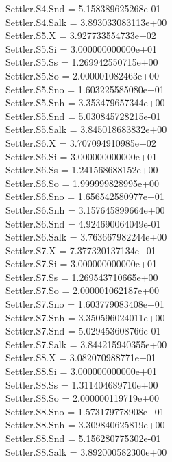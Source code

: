 Settler.S4.Snd = 5.158389625268e-01\\
Settler.S4.Salk = 3.893033083113e+00\\
Settler.S5.X = 3.927733554733e+02\\
Settler.S5.Si = 3.000000000000e+01\\
Settler.S5.Ss = 1.269942550715e+00\\
Settler.S5.So = 2.000001082463e+00\\
Settler.S5.Sno = 1.603225585080e+01\\
Settler.S5.Snh = 3.353479657344e+00\\
Settler.S5.Snd = 5.030845728215e-01\\
Settler.S5.Salk = 3.845018683832e+00\\
Settler.S6.X = 3.707094910985e+02\\
Settler.S6.Si = 3.000000000000e+01\\
Settler.S6.Ss = 1.241568688152e+00\\
Settler.S6.So = 1.999999828995e+00\\
Settler.S6.Sno = 1.656542580977e+01\\
Settler.S6.Snh = 3.157645899664e+00\\
Settler.S6.Snd = 4.924690064049e-01\\
Settler.S6.Salk = 3.763667982244e+00\\
Settler.S7.X = 7.377320137134e+01\\
Settler.S7.Si = 3.000000000000e+01\\
Settler.S7.Ss = 1.269543710665e+00\\
Settler.S7.So = 2.000001062187e+00\\
Settler.S7.Sno = 1.603779083408e+01\\
Settler.S7.Snh = 3.350596024011e+00\\
Settler.S7.Snd = 5.029453608766e-01\\
Settler.S7.Salk = 3.844215940355e+00\\
Settler.S8.X = 3.082070988771e+01\\
Settler.S8.Si = 3.000000000000e+01\\
Settler.S8.Ss = 1.311404689710e+00\\
Settler.S8.So = 2.000000119719e+00\\
Settler.S8.Sno = 1.573179778908e+01\\
Settler.S8.Snh = 3.309840625819e+00\\
Settler.S8.Snd = 5.156280775302e-01\\
Settler.S8.Salk = 3.892000582300e+00\\
